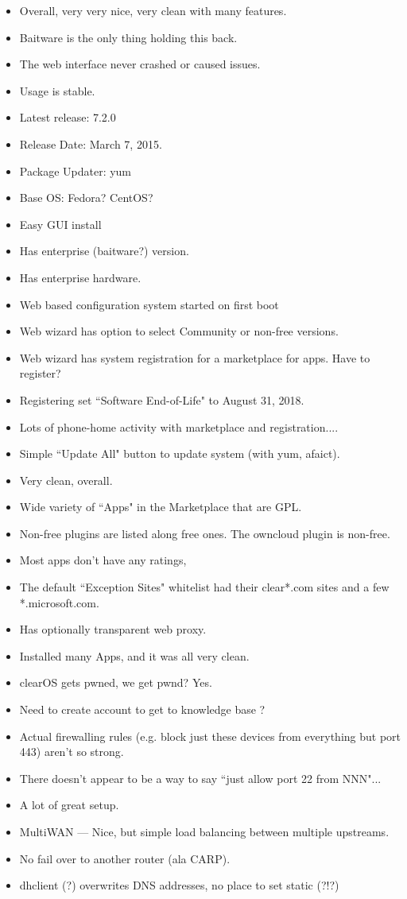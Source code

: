 \begin{itemize}
 \item Overall, very very nice, very clean with many features.
 \item Baitware is the only thing holding this back.
 \item The web interface never crashed or caused issues.
 \item Usage is stable.
 \item Latest release: 7.2.0
 \item Release Date: March 7, 2015.
 \item Package Updater: yum
 \item Base OS: Fedora? CentOS?
 \item Easy GUI install
 \item Has enterprise (baitware?) version.
 \item Has enterprise hardware.
 \item Web based configuration system started on first boot
 \item Web wizard has option to select Community or non-free versions.
 \item Web wizard has system registration for a marketplace for apps. Have to register?
 \item Registering set ``Software End-of-Life" to August 31, 2018.
 \item Lots of phone-home activity with marketplace and registration....
 \item Simple ``Update All" button to update system (with yum, afaict).
 \item Very clean, overall.
 \item Wide variety of ``Apps" in the Marketplace that are GPL.
 \item Non-free plugins are listed along free ones. The owncloud plugin is non-free.
 \item Most apps don't have any ratings,
 \item The default ``Exception Sites" whitelist had their clear*.com sites and a few *.microsoft.com.
 \item Has optionally transparent web proxy.
 \item Installed many Apps, and it was all very clean.
 \item clearOS gets pwned, we get pwnd? Yes.
 \item Need to create account to get to knowledge base ?
 \item Actual firewalling rules (e.g. block just these devices from everything but port 443) aren't so strong.
 \item There doesn't appear to be a way to say ``just allow port 22 from NNN"...
 \item A lot of great setup.
 \item MultiWAN --- Nice, but simple load balancing between multiple upstreams.
 \item No fail over to another router (ala CARP).
 \item dhclient (?) overwrites DNS addresses, no place to set static (?!?)
\end{itemize}


